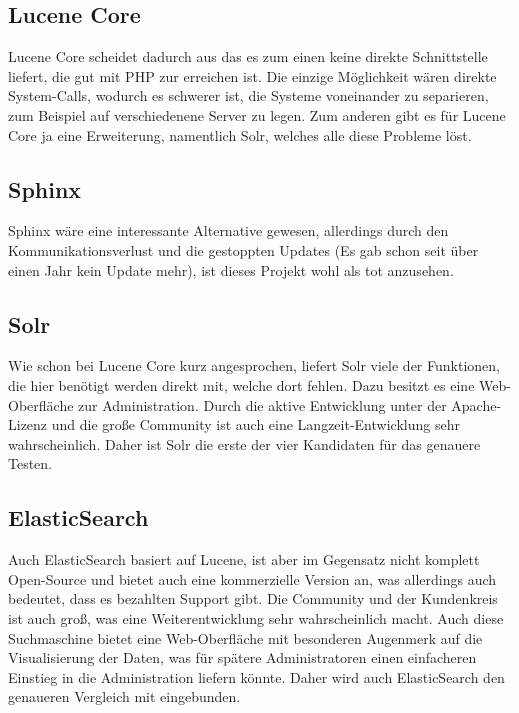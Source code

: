 \subsection{Lucene Core}

Lucene Core scheidet dadurch aus das es zum einen keine direkte Schnittstelle liefert, die gut mit PHP zur erreichen ist. Die einzige Möglichkeit wären direkte System-Calls, wodurch es schwerer ist, die Systeme voneinander zu separieren, zum Beispiel auf verschiedenene Server zu legen. Zum anderen gibt es für Lucene Core ja eine Erweiterung, namentlich Solr, welches alle diese Probleme löst. \cite{TheApacheSoftwareFoundation.2019b}

\subsection{Sphinx}

Sphinx wäre eine interessante Alternative gewesen, allerdings durch den Kommunikationsverlust und die gestoppten Updates (Es gab schon seit über einen Jahr kein Update mehr), ist dieses Projekt wohl als tot anzusehen. \cite{SphinxTechnologiesInc.2019}

\subsection{Solr}

Wie schon bei Lucene Core kurz angesprochen, liefert Solr viele der Funktionen, die hier benötigt werden direkt mit, welche dort fehlen. Dazu besitzt es eine Web-Oberfläche zur Administration. Durch die aktive Entwicklung unter der Apache-Lizenz und die große Community ist auch eine Langzeit-Entwicklung sehr wahrscheinlich. Daher ist Solr die erste der vier Kandidaten für das genauere Testen. \cite{TheApacheSoftwareFoundation.2019}

\subsection{ElasticSearch}

Auch ElasticSearch basiert auf Lucene, ist aber im Gegensatz nicht komplett Open-Source und bietet auch eine kommerzielle Version an, was allerdings auch bedeutet, dass es bezahlten Support gibt. Die Community und der Kundenkreis ist auch groß, was eine Weiterentwicklung sehr wahrscheinlich macht. Auch diese Suchmaschine bietet eine Web-Oberfläche mit besonderen Augenmerk auf die Visualisierung der Daten, was für spätere Administratoren einen einfacheren Einstieg in die Administration liefern könnte. Daher wird auch ElasticSearch den genaueren Vergleich mit eingebunden. \cite{Elasticsearch.2019}

